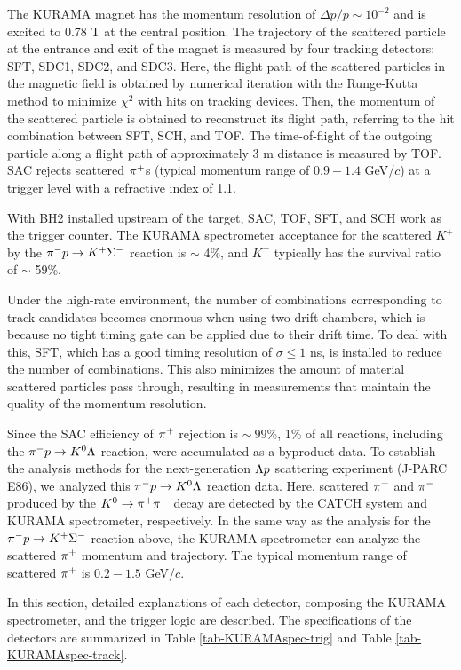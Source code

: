 The KURAMA magnet has the momentum resolution of $\Delta p/p \sim10^{-2}$ \cite{Miwa-SMp} and is excited to 0.78 T at the central position. The trajectory of the scattered particle at the entrance and exit of the magnet is measured by four tracking detectors: SFT, SDC1, SDC2, and SDC3. Here, the flight path of the scattered particles in the magnetic field is obtained by numerical iteration with the Runge-Kutta method \cite{Runge} to minimize $\chi^2$ with hits on tracking devices. Then, the momentum of the scattered particle is obtained to reconstruct its flight path, referring to the hit combination between SFT, SCH, and TOF. The time-of-flight of the outgoing particle along a flight path of approximately 3 m distance is measured by TOF. SAC rejects scattered $\pi^{+}$s (typical momentum range of $0.9-1.4$ GeV/$c$) at a trigger level with a refractive index of 1.1.%

With BH2 installed upstream of the target, SAC, TOF, SFT, and SCH work as the trigger counter. The KURAMA spectrometer acceptance for the scattered $K^+$ by the $\pi^- p \to K^+ \Sigma^-$ reaction is $\sim$ 4\%, and $K^+$ typically has the survival ratio of $\sim$ 59\%. 
  
Under the high-rate environment, the number of combinations corresponding to track candidates becomes enormous when using two drift chambers, which is because no tight timing gate can be applied due to their drift
time. To deal with this, SFT, which has a good timing resolution of $\sigma \leq 1$ ns, is installed to reduce the number of combinations. This also minimizes the amount of material scattered particles pass through, resulting in measurements that maintain the quality of the momentum resolution.

Since the SAC efficiency of $\pi^{+}$ rejection is $\sim\ 99$\%, 1\% of all reactions, including the $\pi^- p \to K^0 \Lambda$ reaction, were accumulated as a byproduct data. To establish the analysis methods for the next-generation $\Lambda p$ scattering experiment (J-PARC E86), we analyzed this $\pi^- p \to K^0 \Lambda$ reaction data. Here, scattered $\pi^{+}$ and $\pi^{-}$ produced by the $K^0 \to \pi^+ \pi^-$ decay are detected by the CATCH system and KURAMA spectrometer, respectively. In the same way as the analysis for the $\pi^- p \to K^+ \Sigma^-$ reaction above, the KURAMA spectrometer can analyze the scattered $\pi^{+}$ momentum and trajectory. The typical momentum range of scattered $\pi^{+}$ is $0.2-1.5$ GeV/$c$.

In this section, detailed explanations of each detector, composing the KURAMA spectrometer, and the trigger logic are described. The specifications of the detectors are summarized in Table \ref{tab-KURAMAspec-trig} and Table \ref{tab-KURAMAspec-track}.

